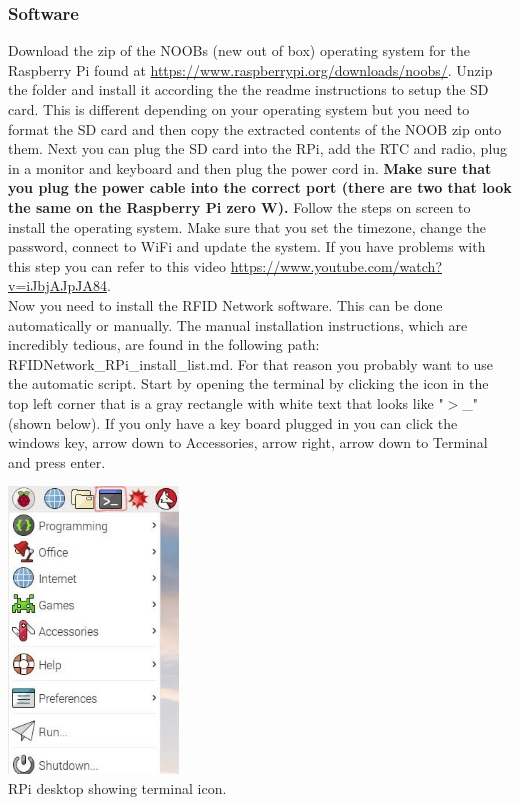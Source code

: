 \documentclass[12pt]{article}
\begin{document}
\subsubsection{Software}
Download the zip of the NOOBs (new out of box) operating system for the Raspberry Pi found at \url{https://www.raspberrypi.org/downloads/noobs/}.  Unzip the folder and install it according the the readme instructions to setup the SD card.  This is different depending on your operating system but you need to format the SD card and then copy the extracted contents of the NOOB zip onto them.  Next you can plug the SD card into the RPi, add the RTC and radio, plug in a monitor and keyboard and then plug the power cord in.  \textbf{Make sure that you plug the power cable into the correct port (there are two that look the same on the Raspberry Pi zero W).}  Follow the steps on screen to install the operating system.  Make sure that you set the timezone, change the password, connect to WiFi and update the system.  If you have problems with this step you can refer to this video \url{https://www.youtube.com/watch?v=iJbjAJpJA84}.\\
Now you need to install the RFID Network software.  This can be done automatically or manually.  The manual installation instructions, which are incredibly tedious, are found in the following path: RFIDNetwork\_RPi\_install\_list.md.  For that reason you probably want to use the automatic script.  Start by opening the terminal by clicking the icon in the top left corner that is a gray rectangle with white text that looks like "$>$\_" (shown below).  If you only have a key board plugged in you can click the windows key, arrow down to Accessories, arrow right, arrow down to Terminal and press enter.\\
\begin{center}
	\includegraphics[height=3in]{RPi_desktop}\\
	RPi desktop showing terminal icon.
\end{center}
\end{document}
